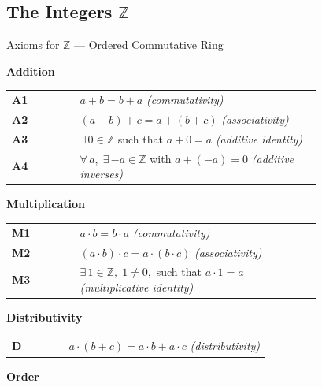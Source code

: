 \subsection*{\texorpdfstring{The Integers $\mathbb{Z}$}{The Integers Z}}

\begin{topicbox}{Axioms for $\mathbb{Z}$ --- Ordered Commutative Ring}
\begin{exposition}

\medskip
\noindent\textbf{Addition}

\medskip
\begin{tabular}{@{} l p{0.78\linewidth} @{}}
\textbf{A1} & $a + b = b + a$ \hfill\textit{(commutativity)} \\[3pt]
\textbf{A2} & $(a + b) + c = a + (b + c)$ \hfill\textit{(associativity)} \\[3pt]
\textbf{A3} & $\exists\, 0 \in \mathbb{Z}$ such that $a + 0 = a$
             \hfill\textit{(additive identity)} \\[3pt]
\textbf{A4} & $\forall\, a,\; \exists\, {-a} \in \mathbb{Z}$ with
             $a + (-a) = 0$
             \hfill\textit{(additive inverses)} \\[6pt]
\end{tabular}

\noindent\textbf{Multiplication}

\medskip
\begin{tabular}{@{} l p{0.78\linewidth} @{}}
\textbf{M1} & $a \cdot b = b \cdot a$ \hfill\textit{(commutativity)} \\[3pt]
\textbf{M2} & $(a \cdot b) \cdot c = a \cdot (b \cdot c)$
             \hfill\textit{(associativity)} \\[3pt]
\textbf{M3} & $\exists\, 1 \in \mathbb{Z},\; 1 \neq 0,$ such that $a \cdot 1 = a$
             \hfill\textit{(multiplicative identity)} \\[6pt]
\end{tabular}

\noindent\textbf{Distributivity}

\medskip
\begin{tabular}{@{} l p{0.78\linewidth} @{}}
\textbf{D} & $a \cdot (b + c) = a \cdot b + a \cdot c$
            \hfill\textit{(distributivity)} \\[6pt]
\end{tabular}

\noindent\textbf{Order}


\end{exposition}
\end{topicbox}
